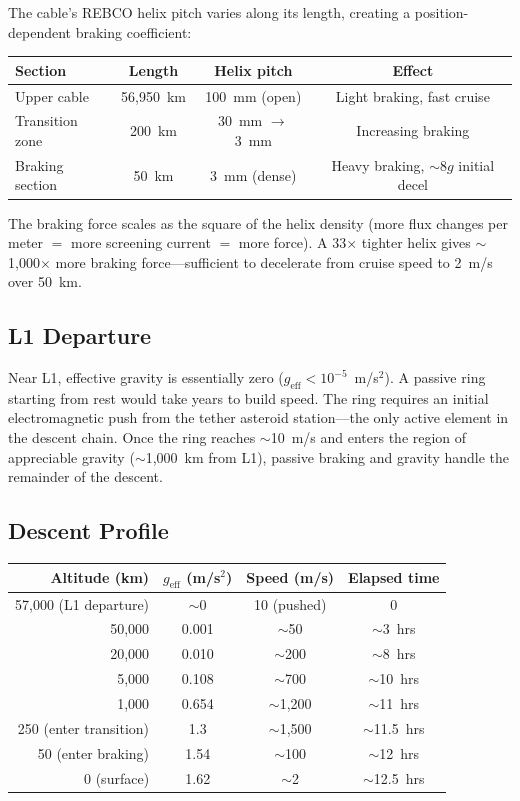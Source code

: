 \documentclass[12pt,letterpaper]{article}
\begin{document}
The cable's REBCO helix pitch varies along its length, creating a position-dependent braking coefficient:

\begin{center}
\small
\begin{tabular}{lccc}
\toprule
\textbf{Section} & \textbf{Length} & \textbf{Helix pitch} & \textbf{Effect} \\
\midrule
Upper cable & 56,950~km & 100~mm (open) & Light braking, fast cruise \\
Transition zone & 200~km & 30~mm $\to$ 3~mm & Increasing braking \\
Braking section & 50~km & 3~mm (dense) & Heavy braking, $\sim$8$g$ initial decel \\
\bottomrule
\end{tabular}
\end{center}

The braking force scales as the square of the helix density (more flux changes per meter $=$ more screening current $=$ more force). A 33$\times$ tighter helix gives $\sim$1,000$\times$ more braking force---sufficient to decelerate from cruise speed to 2~m/s over 50~km.

\subsection{L1 Departure}

Near L1, effective gravity is essentially zero ($g_{\text{eff}} < 10^{-5}$~m/s$^2$). A passive ring starting from rest would take years to build speed. The ring requires an initial electromagnetic push from the tether asteroid station---the only active element in the descent chain. Once the ring reaches $\sim$10~m/s and enters the region of appreciable gravity ($\sim$1,000~km from L1), passive braking and gravity handle the remainder of the descent.

\subsection{Descent Profile}

\begin{center}
\small
\begin{tabular}{rccc}
\toprule
\textbf{Altitude (km)} & \textbf{$g_{\text{eff}}$ (m/s$^2$)} & \textbf{Speed (m/s)} & \textbf{Elapsed time} \\
\midrule
57,000 (L1 departure) & $\sim$0 & 10 (pushed) & 0 \\
50,000 & 0.001 & $\sim$50 & $\sim$3~hrs \\
20,000 & 0.010 & $\sim$200 & $\sim$8~hrs \\
5,000 & 0.108 & $\sim$700 & $\sim$10~hrs \\
1,000 & 0.654 & $\sim$1,200 & $\sim$11~hrs \\
250 (enter transition) & 1.3 & $\sim$1,500 & $\sim$11.5~hrs \\
50 (enter braking) & 1.54 & $\sim$100 & $\sim$12~hrs \\
0 (surface) & 1.62 & $\sim$2 & $\sim$12.5~hrs \\
\bottomrule
\end{tabular}
\end{center}
\end{document}
